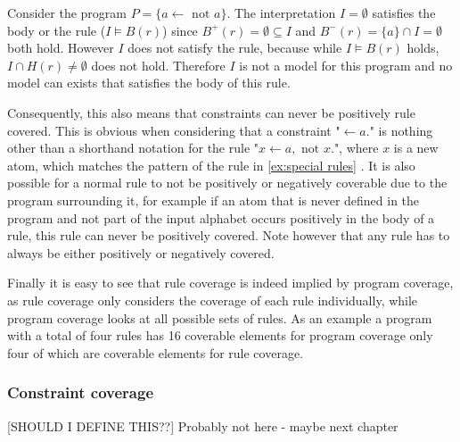 \begin{example}
\label{ex:special rules}
    Consider the program \(P = \{a \leftarrow \text{ not } a\}\).
    The interpretation \(I = \emptyset\) satisfies the body or the rule (\(I \models B(r)\)) since \(B^+(r) = \emptyset \subseteq I\) and \(B^-(r) = \{a\} \cap I = \emptyset\) both hold. However $I$ does not satisfy the rule, because while \(I \models B(r)\) holds, \(I \cap H(r) \neq \emptyset\) does not hold. Therefore $I$ is not a model for this program and no model can exists that satisfies the body of this rule.
\end{example}

Consequently, this also means that constraints can never be positively rule covered. This is obvious when considering that a constraint "\(\leftarrow a.\)" is nothing other than a shorthand notation for the rule "\(x \leftarrow a, \text{ not } x.\)", where $x$ is a new atom, which matches the pattern of the rule in \cref{ex:special rules} \cite[p. 17]{Geb+12}. It is also possible for a normal rule to not be positively or negatively coverable due to the program surrounding it, for example if an atom that is never defined in the program and not part of the input alphabet occurs positively in the body of a rule, this rule can never be positively covered. Note however that any rule has to always be either positively or negatively covered.

Finally it is easy to see that rule coverage is indeed implied by program coverage, as rule coverage only considers the coverage of each rule individually, while program coverage looks at all possible sets of rules. As an example a program with a total of four rules has 16 coverable elements for program coverage only four of which are coverable elements for rule coverage.

\subsubsection{Constraint coverage}
\label{subsubsec:Coverage metrics/Branch-like coverage/Rule coverage/Constraint coverage}
[SHOULD I DEFINE THIS??] Probably not here - maybe next chapter

